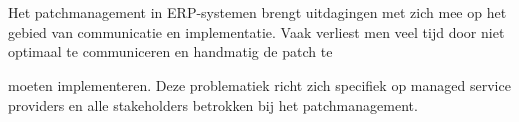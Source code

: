 
\chapter{}%
\label{ch:inleiding}




\section{}%
\label{sec:probleemstelling}

Het patchmanagement in ERP-systemen brengt uitdagingen met zich mee op het gebied van communicatie en implementatie. Vaak verliest men veel tijd door niet optimaal te communiceren en handmatig de patch te

moeten implementeren. Deze problematiek richt zich specifiek op managed service providers en alle stakeholders betrokken bij het patchmanagement.

\section{}%
\label{sec:onderzoeksvraag}

